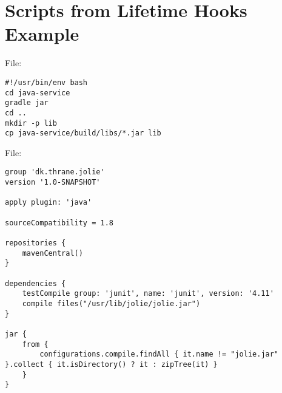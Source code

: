 \section{Scripts from Lifetime Hooks Example}

File: 

\begin{verbatim}
#!/usr/bin/env bash
cd java-service
gradle jar
cd ..
mkdir -p lib
cp java-service/build/libs/*.jar lib
\end{verbatim}

File: 

\begin{verbatim}
group 'dk.thrane.jolie'
version '1.0-SNAPSHOT'

apply plugin: 'java'

sourceCompatibility = 1.8

repositories {
    mavenCentral()
}

dependencies {
    testCompile group: 'junit', name: 'junit', version: '4.11'
    compile files("/usr/lib/jolie/jolie.jar")
}

jar {
    from {
        configurations.compile.findAll { it.name != "jolie.jar" }.collect { it.isDirectory() ? it : zipTree(it) }
    }
}
\end{verbatim}

